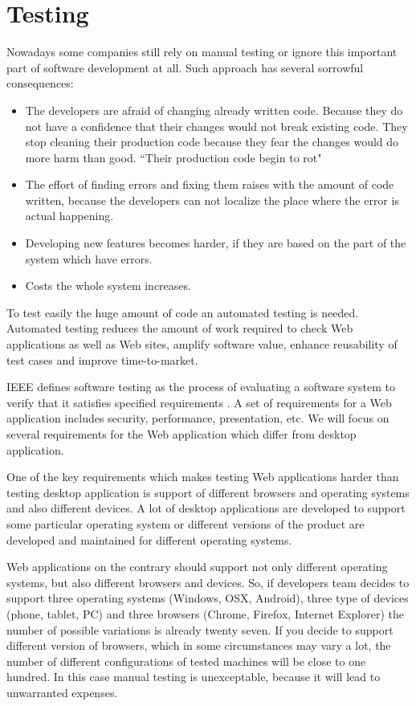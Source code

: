 \section{Testing}
		Nowadays some companies still rely on manual testing or ignore this
		important part of software development at all. Such approach has several
		sorrowful consequences:
		\begin{itemize}
			\item The developers are afraid of changing already written
			code. Because they do not have a confidence that their changes would not 
			break existing code. They stop cleaning their production code because they
			fear the changes would do more harm than good. ``Their production code begin
			to rot"
			\cite[p.123]{cleancode} 
			
			\item The effort of finding errors and	fixing them raises with the amount of
			code written, because the developers can not localize the place where the
			error is actual happening.
			\item Developing new features becomes harder, if they are based on the part
			of the system which have errors.
		
			\item Costs the whole system increases.
	 	 \end{itemize}
	 	 
	 	 To test easily the huge amount of code an automated testing is needed.	
	 	 Automated testing reduces the amount of work required to check Web applications as
	 	 well as Web sites, amplify software value, enhance reusability of test cases and improve time-to-market.
	   
		IEEE defines software testing as the process of evaluating a software
		system to verify that it satisfies specified requirements \cite{Xu1}. A set of
		requirements for a Web application includes security, performance,
		presentation, etc. We will focus on several requirements for the Web
		application which differ from desktop application. 
		
		One of the key requirements which makes testing Web applications harder than
		testing desktop application is support of different browsers and operating systems and also
		different devices. A lot of desktop applications are developed to support some
		particular operating system or different versions of the product are developed
		and maintained for different operating systems. 
		
		Web applications on the	contrary should support not only different operating systems, but also
		different browsers and devices. So, if developers team decides to support
		three operating systems (Windows, OSX, Android), three type of devices (phone,
		tablet, PC) and three browsers (Chrome, Firefox, Internet Explorer) the number
		of possible variations is already twenty seven. If you decide to support
		different version of browsers, which in some circumstances may vary a lot,
		the number of different configurations of tested machines will be close to
		one hundred. In this case manual testing is unexceptable, because it will lead
		to unwarranted expenses. 
		
